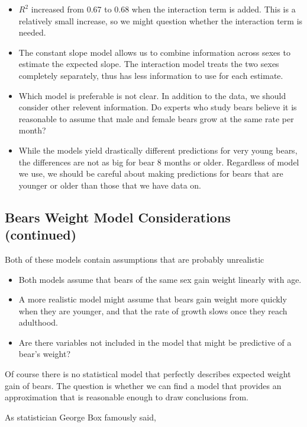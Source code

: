 \documentclass[]{book}
\begin{document}
\begin{itemize}
\item
  \(R^2\) increased from 0.67 to 0.68 when the interaction term is
  added. This is a relatively small increase, so we might question
  whether the interaction term is needed.
\item
  The constant slope model allows us to combine information across sexes
  to estimate the expected slope. The interaction model treats the two
  sexes completely separately, thus has less information to use for each
  estimate.
\item
  Which model is preferable is not clear. In addition to the data, we
  should consider other relevent information. Do experts who study bears
  believe it is reasonable to assume that male and female bears grow at
  the same rate per month?
\item
  While the models yield drastically different predictions for very
  young bears, the differences are not as big for bear 8 months or
  older. Regardless of model we use, we should be careful about making
  predictions for bears that are younger or older than those that we
  have data on.
\end{itemize}

\subsection{Bears Weight Model Considerations
(continued)}\label{bears-weight-model-considerations-continued}

Both of these models contain assumptions that are probably unrealistic

\begin{itemize}
\item
  Both models assume that bears of the same sex gain weight linearly
  with age.
\item
  A more realistic model might assume that bears gain weight more
  quickly when they are younger, and that the rate of growth slows once
  they reach adulthood.
\item
  Are there variables not included in the model that might be predictive
  of a bear's weight?
\end{itemize}

Of course there is no statistical model that perfectly describes
expected weight gain of bears. The question is whether we can find a
model that provides an approximation that is reasonable enough to draw
conclusions from.

As statistician George Box famously said,
\end{document}
